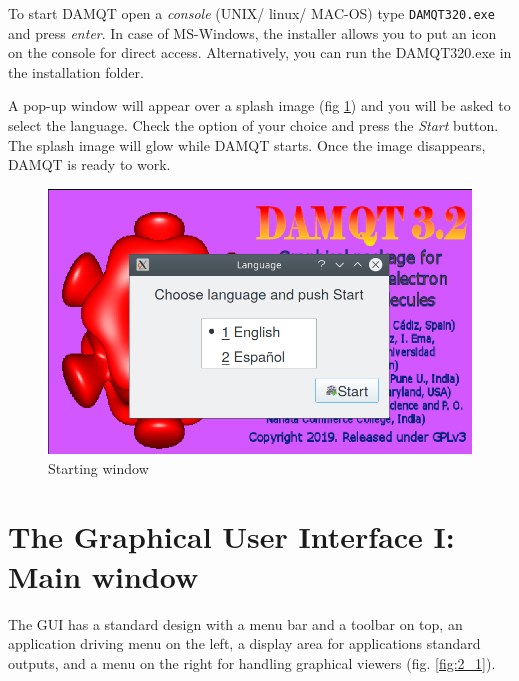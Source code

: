 \documentclass[10pt]{article}
\begin{document}
\begin{minipage}{.65\linewidth}

To start DAMQT open a {\it console} (UNIX/ linux/ MAC-OS) type \texttt{DAMQT320.exe} and press {\it enter}. 
In case of MS-Windows, the installer allows you to put an icon on the console for direct access.
Alternatively, you can run the DAMQT320.exe in the installation folder.

A pop-up window will appear over a splash image (fig \ref{fig:1_3_1}) 
and you will be asked to select the language. Check the 
option of your choice and press the {\it Start} button. The splash image will glow while  
DAMQT starts. Once the image disappears, DAMQT is ready to work.

\end{minipage}
\begin{minipage}{.38\linewidth}
\vspace*{-8mm}
\begin{figure}[H]
\begin{center}
\includegraphics[width=.83\linewidth]{damqt320_splash.png}
\end{center}
\caption{{Starting window}\label{fig:1_3_1}}
\end{figure}
\end{minipage}

\newpage

\section{The Graphical User Interface I: Main window \label{sec:2}}
The GUI has a standard design with a menu bar and a toolbar on top, an
application driving menu on the left, a display area for applications standard outputs, and
a menu on the right for handling graphical viewers (fig. \ref{fig:2_1}).
\end{document}
